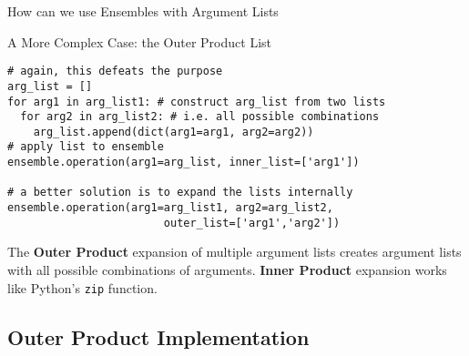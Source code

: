 \documentclass[hyperref={pdfpagelabels=false},compress,final]{beamer}
\newenvironment{myCode}[3][shadow=true]%
{\begin{center} \begin{minipage}{#2} \begin{beamerboxesrounded}[#1]{#3}}%
      {\end{beamerboxesrounded} \end{minipage} \end{center}}
\begin{document}
\begin{frame}[fragile=singleslide]{How can we use Ensembles with Argument Lists}
  \begin{myCode}{\textwidth}{A More Complex Case: the Outer Product List}
    \small
    \begin{verbatim}
# again, this defeats the purpose
arg_list = []
for arg1 in arg_list1: # construct arg_list from two lists
  for arg2 in arg_list2: # i.e. all possible combinations
    arg_list.append(dict(arg1=arg1, arg2=arg2))
# apply list to ensemble
ensemble.operation(arg1=arg_list, inner_list=['arg1'])

# a better solution is to expand the lists internally
ensemble.operation(arg1=arg_list1, arg2=arg_list2,
                        outer_list=['arg1','arg2'])
    \end{verbatim}
  \end{myCode}
  \smallskip
  The \textbf{Outer Product} expansion of multiple argument lists creates argument lists with all possible combinations of arguments.
  \textbf{Inner Product} expansion works like Python's \texttt{zip} function.
\end{frame}


\subsection[Implementation]{Outer Product Implementation}
\end{document}
